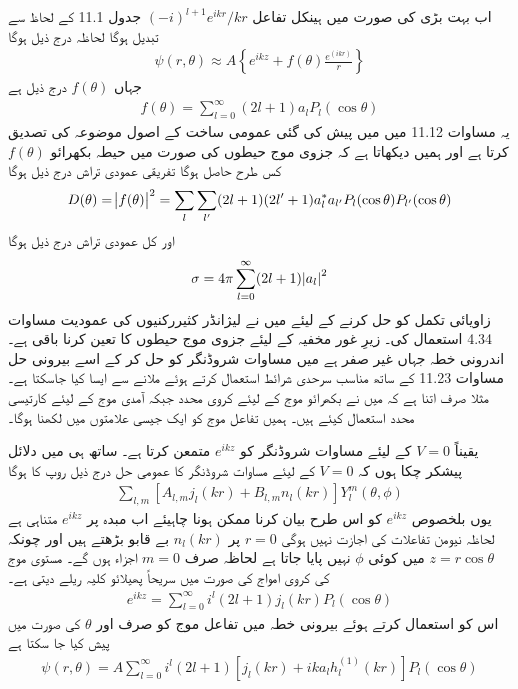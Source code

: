 اب بہت بڑی  کی صورت میں ہینکل تفاعل \((-i)^{l+1}e^{ikr}/kr\) جدول \num{11.1} کے لحاظ سے تبدیل ہوگا لحاظہ درج ذیل ہوگا 
\begin{align}
	\psi(r, \theta)\approx A\left\{e^{ikz}+f(\theta)\frac{e^{(ikr)}}{r}\right\}
\end{align}
جہاں \(f(\theta)\) درج ذیل ہے
\begin{align}
	f(\theta) = \sum_{l=0}^{\infty}(2l+1)a_lP_l(\cos\theta)
\end{align}
یہ مساوات \num{11.12} میں میں پیش کی گئی عمومی ساخت کے اصول موضوعہ کی تصدیق کرتا ہے اور ہمیں دیکھاتا ہے کہ جزوی موج حیطوں  کی صورت میں حیطہ بکھرائو \(f(\theta)\) کس طرح حاصل ہوگا تفریقی عمودی تراش درج ذیل ہوگا
\begin{align}
	D(\theta) = \abs{f(\theta)}^2 = \sum_{l}\sum_{l^\prime}(2l+1)(2l^\prime+1)a^*_la_{l^\prime}P_l(\cos\theta)P_{l^\prime}(\cos\theta)
\end{align}
اور کل عمودی تراش درج ذیل ہوگا
\begin{align}
	\sigma=4\pi\sum_{l=0}^{\infty}(2l+1)\abs{a_l}^2
\end{align}
زاویائی تکمل کو حل کرنے کے لیئے میں نے لیژانڈر کثیررکنیوں کی عمودیت مساوات \num{4.34} استعمال کی۔
زیرِ غور مخفیہ کے لیئے جزوی موج حیطوں  کا تعین کرنا باقی ہے۔ اندرونی خطہ جہاں  غیر صفر ہے میں مساوات شروڈنگر کو حل کر کے اسے بیرونی حل مساوات \num{11.23} کے ساتھ مناسب سرحدی شرائط استعمال کرتے ہوئے ملانے سے ایسا کیا جاسکتا ہے۔ مثلا صرف اتنا ہے کہ میں نے بکھرائو موج کے لیئے کروی محدد جبکہ آمدی موج کے لیئے کارتیسی محدد استعمال کیئے ہیں۔ ہمیں تفاعل موج کو ایک جیسی علامتوں میں لکھنا ہوگا۔

یقیناً \(V=0\) کے لیئے مساوات شروڈنگر کو \(e^{ikz}\) متمعن کرتا ہے۔ ساتھ ہی میں دلائل پیشکر چکا ہوں کہ \(V=0\) کے لیئے مساوات شروڈنگر کا عمومی حل درج ذیل روپ کا ہوگا
\begin{align*}
	\sum_{l, m}\left[A_{l, m}j_l(kr)+B_{l, m}n_l(kr)\right]Y_l^m(\theta, \phi)
\end{align*}
یوں بلخصوص \(e^{ikz}\) کو اس طرح بیان کرنا ممکن ہونا چاہیئے اب مبدہ پر \(e^{ikz}\) متناہی ہے لحاظہ نیومن تفاعلات کی اجازت نہیں ہوگی \(r=0\) پر \(n_l(kr)\) بے قابو بڑھتے ہیں اور چونکہ \(z=r\cos\theta\) میں کوئی \(\phi\) نہیں پایا جاتا ہے لحاظہ صرف \(m=0\) اجزاء ہوں گے۔ مستوی موج کی کروی امواج کی صورت میں سریحاً پھیلائو کلیہ ریلے دیتی ہے۔
\begin{align}
	e^{ikz} = \sum_{l=0}^{\infty}i^l(2l+1)j_l(kr)P_l(\cos\theta)
\end{align}
اس کو استعمال کرتے ہوئے بیرونی خطہ میں تفاعل موج کو صرف  اور \(\theta\) کی صورت میں پیش کیا جا سکتا ہے
\begin{align}
	\psi(r, \theta) = A\sum_{l=0}^{\infty}i^l(2l+1)\left[j_l(kr)+ika_lh_l^{(1)}(kr)\right]P_l(\cos\theta)
\end{align}

